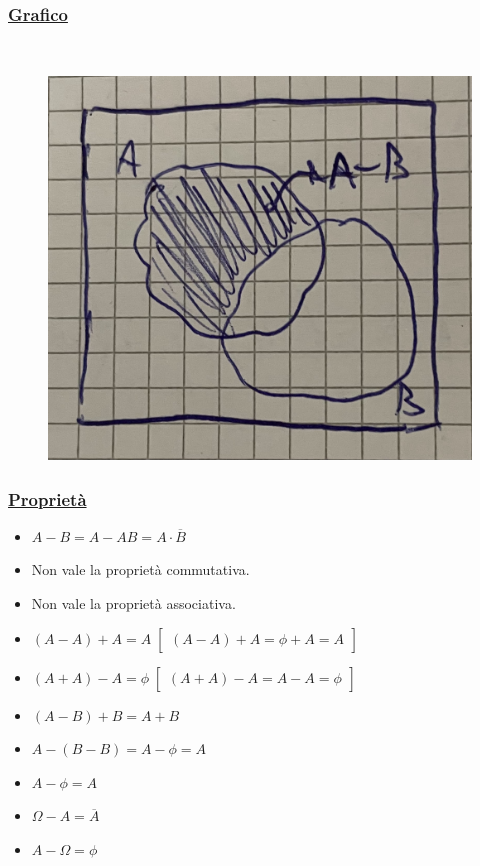 \documentclass{article}
\begin{document}
\subsubsection{\underline{Grafico}} ~\\
\begin{figure}[ht]
\centering
\includegraphics[scale=0.13]{images/20.VennDiff.jpeg}
\end{figure} 
\subsubsection{\underline{Proprietà}}
\begin{itemize}
    \item $A-B=A-AB = A \cdot \overline{B}$
    \item Non vale la proprietà commutativa.
    \item Non vale la proprietà associativa.
    \item $\left( A - A \right) + A = A \; \begin{bmatrix} (A-A)+A = \phi +A = A \end{bmatrix}$
    \item $\left( A + A \right) - A = \phi \; \begin{bmatrix} (A+A)-A = A - A = \phi \end{bmatrix}$
    \item $(A - B) +B = A+B$
    \item $A - (B-B) = A - \phi = A$
    \item $A- \phi = A$
    \item $\Omega - A = \overline{A}$
    \item $A - \Omega = \phi$
\end{itemize}
\end{document}
